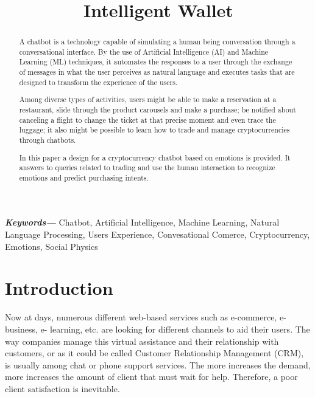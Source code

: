 \documentclass[	DIV=calc,%
							paper=letter,%
							fontsize=12pt%
                            ]{scrartcl}	 					%
\title{Intelligent Wallet}					%
\author{}											%
\date{}																				%
\newcommand{\initial}[1]{%
     \lettrine[lines=3,lhang=0.3,nindent=0em]{
     				\color{DarkGoldenrod}
     				{\textsf{#1}}}{}}
\providecommand{\keywords}[1]
{
  \small	
  \textbf{\textit{Keywords---}} #1
}
\begin{document}
\maketitle


\newpage
\begin{abstract}
	
{A chatbot is a technology capable of simulating a human being conversation through a conversational interface. By the use of Artificial Intelligence (AI) and Machine Learning (ML) techniques, it automates the responses to a user through the exchange of messages in what the user perceives as natural language and executes tasks that are designed to transform the experience of the users.

Among diverse types of activities, users might be able to make a reservation   at a restaurant, slide through the product carousels and make a purchase; be notified about canceling a flight to change the ticket at that precise moment and even trace the luggage; it also might be possible to learn how to trade and manage cryptocurrencies through chatbots.

In this paper a design for a cryptocurrency chatbot based on emotions is provided. It answers to queries related to trading and use the human interaction to recognize emotions and predict purchasing intents.}

\end{abstract}

\keywords{Chatbot, Artificial Intelligence, Machine Learning, Natural Language Processing, Users Experience, Convesational Comerce, Cryptocurrency, Emotions, Social Physics}

\newpage
\tableofcontents
\newpage
\listoffigures
\newpage

\thispagestyle{fancy} 			%

\section{\label{sec:level1}Introduction}
Now at days, numerous different web-based services such as e-commerce, e-business, e- learning, etc. are looking for different channels to aid their users. The way companies manage this virtual assistance and their relationship with customers, or as it could be called Customer Relationship Management (CRM), is usually among chat or phone support services. The more increases the demand, more increases the amount of client that must wait for help.  Therefore, a poor client satisfaction is inevitable\cite{ranoliya2017chatbot_08126057}.
\end{document}
